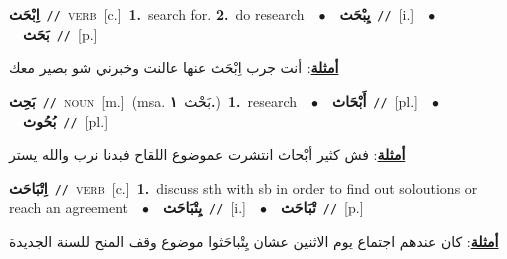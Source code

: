 \documentclass[10pt,a4paper,twoside]{article} %
\begin{document}
\begin{multicols}{2}
{{{{{{\setlength\topsep{0pt}\textbf{\foreignlanguage{arabic}{اِبْحَث}}\ {\color{gray}\texttt{//}\color{black}}\ \textsc{verb}\ [c.]\ \textbf{1.}~search for.  \textbf{2.}~do research\ \ $\bullet$\ \ \setlength\topsep{0pt}\textbf{\foreignlanguage{arabic}{يِبْحَث}}\ {\color{gray}\texttt{//}\color{black}}\ [i.]\ \ $\bullet$\ \ \setlength\topsep{0pt}\textbf{\foreignlanguage{arabic}{بَحَث}}\ {\color{gray}\texttt{//}\color{black}}\ [p.]\  \begin{flushright}\color{gray}\foreignlanguage{arabic}{\textbf{\underline{\foreignlanguage{arabic}{أمثلة}}}: أنت جرب اِبْحَث عنها عالنت وخبرني شو بصير معك}\end{flushright}\color{black}} \vspace{2mm}

{\setlength\topsep{0pt}\textbf{\foreignlanguage{arabic}{بَحِث}}\ {\color{gray}\texttt{//}\color{black}}\ \textsc{noun}\ [m.]\ \color{gray}(msa. \foreignlanguage{arabic}{بَحْث}~\foreignlanguage{arabic}{\textbf{١.}})\color{black}\ \textbf{1.}~research\ \ $\bullet$\ \ \setlength\topsep{0pt}\textbf{\foreignlanguage{arabic}{أَبْحَاث}}\ {\color{gray}\texttt{//}\color{black}}\ [pl.]\ \ $\bullet$\ \ \setlength\topsep{0pt}\textbf{\foreignlanguage{arabic}{بُحُوث}}\ {\color{gray}\texttt{//}\color{black}}\ [pl.]\  \begin{flushright}\color{gray}\foreignlanguage{arabic}{\textbf{\underline{\foreignlanguage{arabic}{أمثلة}}}: فش كثير أبْحاث انتشرت عموضوع اللقاح فبدنا نرب والله يستر}\end{flushright}\color{black}} \vspace{2mm}

{\setlength\topsep{0pt}\textbf{\foreignlanguage{arabic}{اِتْبَاحَث}}\ {\color{gray}\texttt{//}\color{black}}\ \textsc{verb}\ [c.]\ \textbf{1.}~discuss sth with sb in order to find out soloutions or reach an agreement\ \ $\bullet$\ \ \setlength\topsep{0pt}\textbf{\foreignlanguage{arabic}{يِتْبَاحَث}}\ {\color{gray}\texttt{//}\color{black}}\ [i.]\ \ $\bullet$\ \ \setlength\topsep{0pt}\textbf{\foreignlanguage{arabic}{تْبَاحَث}}\ {\color{gray}\texttt{//}\color{black}}\ [p.]\  \begin{flushright}\color{gray}\foreignlanguage{arabic}{\textbf{\underline{\foreignlanguage{arabic}{أمثلة}}}: كان عندهم اجتماع يوم الاثنين عشان يِتْباحَثوا موضوع وقف المنح للسنة الجديدة}\end{flushright}\color{black}} \vspace{2mm}

}}}}}
\end{multicols}
\end{document}
